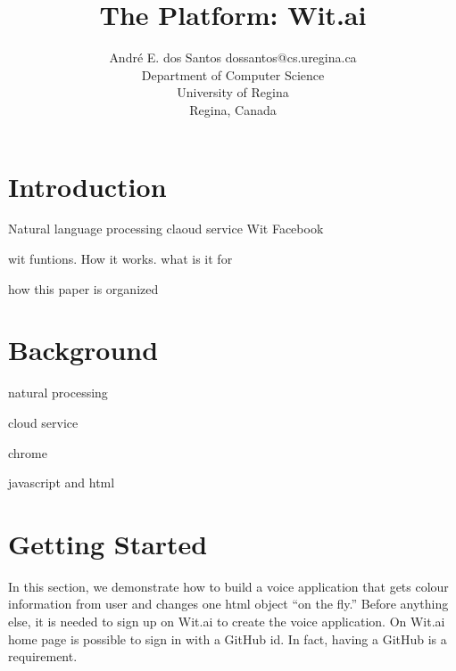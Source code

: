 \documentclass[twoside,11pt]{article}
\begin{document}
\title{The Platform: Wit.ai}

\author{\name André E. dos Santos \email dossantos@cs.uregina.ca \\
\addr Department of Computer Science \\
University of Regina \\ 
Regina, Canada
}



\maketitle
\begin{abstract}%
\end{abstract}



\section{Introduction}
\label{sec:intro}

Natural language processing
claoud service
Wit
Facebook

wit funtions. How it works. what is it for

how this paper is organized


\section{Background}
\label{sec:back}

natural processing

cloud service

chrome

javascript and html

\section{Getting Started}
\label{sec:get}


In this section, we demonstrate how to build a voice application that gets colour information from user and changes one html object ``on the fly.''
Before anything else, it is needed to sign up on Wit.ai to create the voice application.
On Wit.ai home page is possible to sign in with a GitHub \cite{} id.
In fact, having a GitHub is a requirement.
\end{document}
